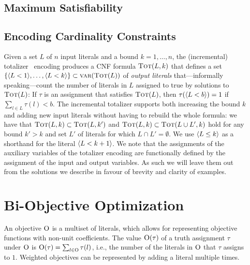 \subsection{Maximum Satisfiability\label{sec:max-sat}}

\subsection{Encoding Cardinality Constraints\label{sec:card-const}}

Given a set $L$ of $n$ input literals and a bound $k=1, \ldots, n$, the (incremental) totalizer~\autocite{DBLP:conf/cp/BailleuxB03,DBLP:conf/cp/MartinsJML14} encoding produces a CNF formula $\textsc{Tot}(L, k)$ that defines a set $\{\langle L < 1 \rangle, \ldots, \langle L < k \rangle\} \subset \textsc{var}(\textsc{Tot}(L))$ of \emph{output literals} that---informally speaking---count the number of literals in $L$ assigned to true by solutions to
 $\textsc{Tot}(L)$: If $\tau$ is an assignment that satisfies $\textsc{Tot}(L)$, then $\tau(\langle L < b \rangle) = 1$ if $\sum_{l \in L} \tau(l) < b$.
The incremental totalizer supports both increasing the bound $k$ and adding new input literals without having to rebuild the whole formula: we have that 
$\textsc{Tot}(L, k) \subset \textsc{Tot}(L, k')$ and $\textsc{Tot}(L, k) \subset  \textsc{Tot}(L \cup L', k)$ hold for any bound $k' > k$ and set $L'$ of literals for which $L \cap L' =  \emptyset$. 
We use $\langle L \leq k \rangle$ as a shorthand for the literal $\langle L < k+1 \rangle$.
We note that the assignments of the auxiliary variables of the totalizer encoding are functionally defined 
by the assignment of the input and output variables. As such we will leave them out from the solutions we describe in favour of brevity and clarity of examples. 

\section{Bi-Objective Optimization\label{sec:biopt}}


An objective $\textsc{O}$ is a multiset of literals, which allows for representing objective functions with non-unit coefficients.
The value $\textsc{O}(\tau)$ of a truth assignment $\tau$ under $\textsc{O}$
is  $\textsc{O}(\tau) = \sum_{l \in \textsc{O}} \tau(l)$, i.e., the number of the literals in $\textsc{O}$ that $\tau$ assigns to $1$. 
Weighted objectives can be represented by adding a literal multiple times. %

